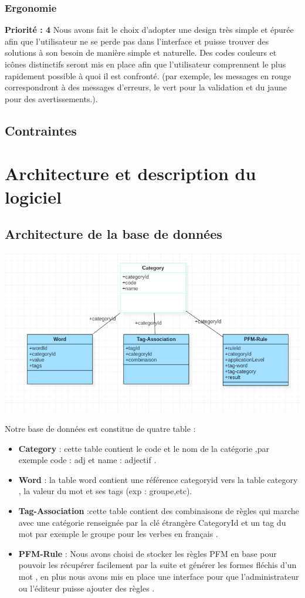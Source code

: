 \documentclass[12pt,a4paper]{article}
\begin{document}
\subsubsection{Ergonomie}
\textbf{Priorité : 4}
\smallbreak
Nous avons fait le choix d'adopter une design très simple et épurée afin que l'utilisateur ne se perde pas dans l'interface et puisse trouver des solutions à son besoin de manière simple et naturelle.
\smallbreak
Des codes couleurs et icônes distinctifs seront mis en place afin que l'utilisateur comprennent le plus rapidement possible à quoi il est confronté. (par exemple, les messages en rouge correspondront à des messages d'erreurs, le vert pour la validation et du jaune pour des avertissements.).

\subsection{Contraintes}

\section{Architecture et description du logiciel}
\subsection{Architecture de la base de données }

\includegraphics[width=150mm]{img/basefinal.PNG}

Notre base de données est constitue de quatre table : 
\begin{itemize}
\item \textbf{Category} : cette table contient le code et le nom de la catégorie ,par exemple code : adj et name : adjectif .
\item \textbf{Word} : la table word contient une référence categoryid vers la table category , la valeur du mot et ses tags (exp : groupe,etc).
\item \textbf{Tag-Association} :cette table contient des combinaisons de règles qui marche avec une catégorie renseignée par la clé étrangère CategoryId  et un tag du mot par exemple le groupe pour les verbes en français .
\item \textbf{PFM-Rule} : Nous avons choisi de stocker les règles PFM en base pour pouvoir les récupérer facilement par la suite et générer les formes fléchis d'un mot , en plus nous avons mis en place une interface pour que l'administrateur ou l'éditeur puisse ajouter des règles .

\end{itemize}
\end{document}
